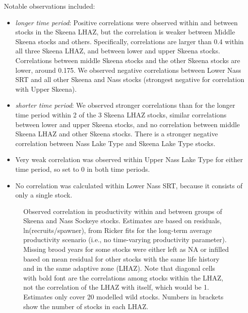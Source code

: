 \documentclass[french,11pt]{book}
\begin{document}
Notable observations included:
\begin{itemize}

\item
  \emph{longer time period}: Positive correlations were observed within and between stocks in the Skeena LHAZ, but the correlation is weaker between Middle Skeena stocks and others. Specifically, correlations are larger than 0.4 within all three Skeena LHAZ, and between lower and upper Skeena stocks. Correlations between middle Skeena stocks and the other Skeena stocks are lower, around 0.175. We observed negative correlations between Lower Nass SRT and all other Skeena and Nass stocks (strongest negative for correlation with Upper Skeena).
\item
  \emph{shorter time period}: We observed stronger correlations than for the longer time period within 2 of the 3 Skeena LHAZ stocks, similar correlations between lower and upper Skeena stocks, and no correlation between middle Skeena LHAZ and other Skeena stocks. There is a stronger negative correlation between Nass Lake Type and Skeena Lake Type stocks.
\item
  Very weak correlation was observed within Upper Nass Lake Type for either time period, so set to 0 in both time periods.
\item
  No correlation was calculated within Lower Nass SRT, because it consists of only a single stock.
\end{itemize}
\clearpage


\begin{figure}[htb]

{\centering {} 

}

\caption{Observed correlation in productivity within and between groups of Skeena and Nass Sockeye stocks. Estimates are based on residuals, ln(recruits/spawner), from Ricker fits for the long-term average productivity scenario (i.e., no time-varying productivity parameter). Missing brood years for some stocks were either left as NA or infilled based on mean residual for other stocks with the same life history and in the same adaptive zone (LHAZ). Note that diagonal cells with bold font are the correlations among stocks within the LHAZ, not the correlation of the LHAZ with itself, which would be 1. Estimates only cover 20 modelled wild stocks. Numbers in brackets show the number of stocks in each LHAZ.}\label{fig:AltCorrMat}
\end{figure}
\clearpage
\end{document}
